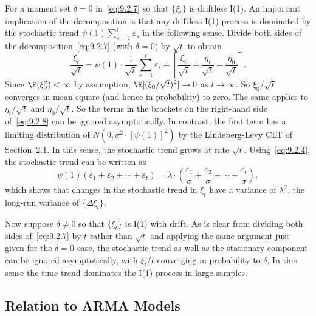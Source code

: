 For a moment set $\delta = 0$ in~\eqref{eq:9.2.7} so that $\{\xi_t\}$ is driftless I(1). An important
implication of the decomposition is that any driftless I(1) process is dominated by
the stochastic trend $\psi(1) \sum_{s=1}^{t} \varepsilon_s$ in the following sense. Divide both sides of the
decomposition~\eqref{eq:9.2.7} (with $\delta = 0$) by $\sqrt{t}$ to obtain
\begin{equation}
\label{eq:9.2.8}
\frac{\xi_t}{\sqrt{t}} = \psi(1) \cdot \frac{1}{\sqrt{t}} \sum_{s=1}^{t} \varepsilon_s
+ \left[\frac{\xi_0}{\sqrt{t}} + \frac{\eta_t}{\sqrt{t}} - \frac{\eta_0}{\sqrt{t}}\right].
\end{equation}
Since $\E(\xi_0^2) < \infty$ by assumption, $\E[(\xi_0/\sqrt{t})^2] \to 0$ as $t \to \infty$. So $\xi_0/\sqrt{t}$ converges in mean square (and hence in probability) to zero. The same applies to
$\eta_t/\sqrt{t}$ and $\eta_0/\sqrt{t}$. So the terms in the brackets on the right-hand side of~\eqref{eq:9.2.8} can
be ignored asymptotically. In contrast, the first term has a limiting distribution of
$N(0, \sigma^2 \cdot [\psi(1)]^2)$ by the Lindeberg-Levy CLT of Section~2.1. In this sense, the stochastic trend grows at rate $\sqrt{t}$. Using~\eqref{eq:9.2.4}, the stochastic trend can be written as
\begin{equation}
\label{eq:9.2.9}
\psi(1)(\varepsilon_1 + \varepsilon_2 + \cdots + \varepsilon_t)
= \lambda \cdot \left(\frac{\varepsilon_1}{\sigma} + \frac{\varepsilon_2}{\sigma} + \cdots + \frac{\varepsilon_t}{\sigma}\right),
\end{equation}
which shows that changes in the stochastic trend in $\xi_t$ have a variance of $\lambda^2$, the
long-run variance of $\{\Delta \xi_t\}$.

Now suppose $\delta \neq 0$ so that $\{\xi_t\}$ is I(1) with drift. As is clear from dividing
both sides of~\eqref{eq:9.2.7} by $t$ rather than $\sqrt{t}$ and applying the same argument just given
for the $\delta = 0$ case, the stochastic trend as well as the stationary component can be
ignored asymptotically, with $\xi_t/t$ converging in probability to $\delta$. In this sense the
time trend dominates the I(1) process in large samples.

\subsection*{Relation to ARMA Models}

